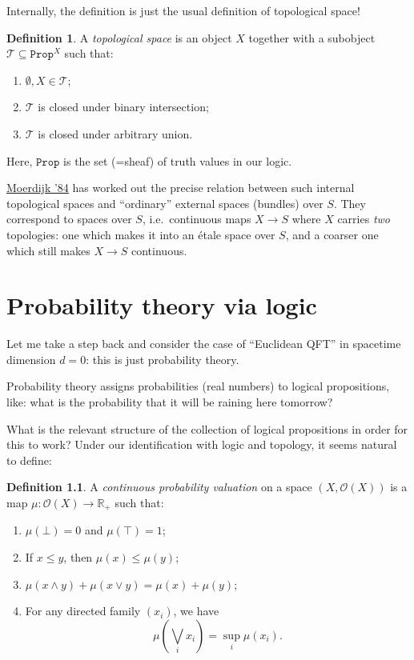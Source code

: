 \documentclass[11pt, oneside, article]{memoir}
\theoremstyle{plain}
\theoremstyle{definition}
\newtheorem{definition}[theorem]{Definition}
\theoremstyle{remark}
\newcommand{\const}[1]{\mathtt{#1}}
\newcommand{\Open}[1]{\mathcal{O}(#1)}
\newcommand{\R}{\mathbb{R}}
\newcommand{\Prop}{\const{Prop}}
\begin{document}
Internally, the definition is just the usual definition of topological space!

\begin{definition}
A \emph{topological space} is an object $X$ together with a subobject $\mathcal{T} \subseteq \Prop^X$ such that:
\begin{enumerate}
\item $\emptyset,X\in\mathcal{T}$;
\item $\mathcal{T}$ is closed under binary intersection;
\item $\mathcal{T}$ is closed under arbitrary union.
\end{enumerate}
\end{definition}

Here, $\Prop$ is the set (=sheaf) of truth values in our logic.

\href{http://www.numdam.org/item?id=CM_1984__53_2_171_0}{Moerdijk '84} has worked out the precise relation between such internal topological spaces and ``ordinary'' external spaces (bundles) over $S$. They correspond to spaces over $S$, i.e.~continuous maps $X \to S$ where $X$ carries \emph{two} topologies: one which makes it into an \'etale space over $S$, and a coarser one which still makes $X \to S$ continuous.

\chapter{Probability theory via logic}

Let me take a step back and consider the case of ``Euclidean QFT'' in spacetime dimension $d = 0$: this is just probability theory.

Probability theory assigns probabilities (real numbers) to logical propositions, like: what is the probability that it will be raining here tomorrow?

What is the relevant structure of the collection of logical propositions in order for this to work? Under our identification with logic and topology, it seems natural to define:

\begin{definition}
	A \emph{continuous probability valuation} on a space $(X,\Open{X})$ is a map $\mu : \Open{X} \to \R_+$ such that:
	\begin{enumerate}
	\item $\mu(\bot) = 0$ and $\mu(\top) = 1$;
	\item If $x\leq y$, then $\mu(x) \leq \mu(y)$;
	\item $\mu(x \land y) + \mu(x \lor y) = \mu(x) + \mu(y)$;
	\item For any directed family $(x_i)$, we have
	\[
		\mu\left( \bigvee_i x_i \right) = \sup_i \mu(x_i).
	\]
	\end{enumerate}
\end{definition}
\end{document}

